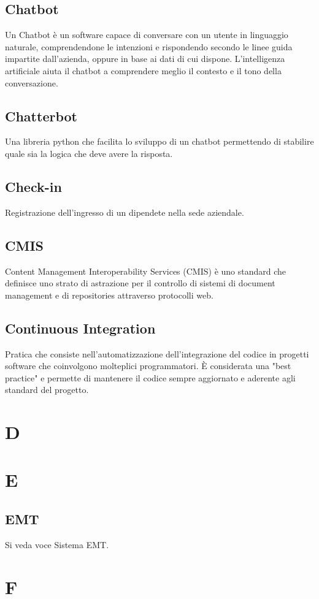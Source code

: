 \subsection{Chatbot}
Un Chatbot è un software capace di conversare con un utente in linguaggio naturale, comprendendone 
le intenzioni e rispondendo secondo le linee guida impartite dall'azienda, oppure in 
base ai dati di cui dispone. L'intelligenza artificiale aiuta il chatbot a comprendere meglio il 
contesto e il tono della conversazione.
\subsection{Chatterbot}
Una libreria python che facilita lo sviluppo di un chatbot permettendo di stabilire quale sia la logica che deve avere la risposta.
\subsection{Check-in}
Registrazione dell'ingresso di un dipendete nella sede aziendale.
\subsection{CMIS}
Content Management Interoperability Services (CMIS) è uno standard che definisce uno strato di astrazione per il controllo di
sistemi di document management e di repositories attraverso protocolli web.
\subsection{Continuous Integration}
Pratica che consiste nell'automatizzazione dell'integrazione del codice in progetti software che coinvolgono
molteplici programmatori. È considerata una "best practice" e permette di mantenere il codice sempre aggiornato e 
aderente agli standard del progetto.
\newpage
\section{D}
\section{E}
\subsection{EMT}
Si veda voce Sistema EMT.
\section{F}
